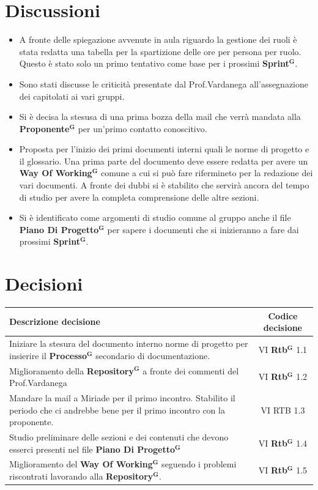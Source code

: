 \documentclass[a4paper,12pt]{article}
\newcommand{\term}[1]{\textbf{#1}$^\mathbf{G}$}
\begin{document}
\section{Discussioni}
\begin{itemize}
    \item A fronte delle spiegazione avvenute in aula riguardo la gestione dei ruoli è stata redatta una tabella per la spartizione delle ore per persona per ruolo. Questo è stato solo un primo tentativo come base per i prossimi \term{Sprint}.
    \item Sono stati discusse le criticità presentate dal Prof.Vardanega all'assegnazione dei capitolati ai vari gruppi.
    \item Si è decisa la stesusa di una prima bozza della mail che verrà mandata alla \term{Proponente} per un'primo contatto conoscitivo.
    \item Proposta per l'inizio dei primi documenti interni quali le norme di progetto e il glossario. Una prima parte del documento deve essere redatta per avere un \term{Way Of Working} comune a cui si può fare rifermineto per la redazione dei vari documenti. A fronte dei dubbi si è stabilito che servirà ancora del tempo di studio per avere la completa comprensione delle altre sezioni.
    \item Si è identificato come argomenti di studio comune al gruppo anche il file \term{Piano Di Progetto} per sapere i documenti che si inizieranno a fare dai prossimi \term{Sprint}.
\end{itemize}

\section{Decisioni}
\begin{center}
\small
\renewcommand{\arraystretch}{1.2} 
\begin{tabular}{|p{}|c|}
\hline
\rowcolor{gray!60} 
\textbf{Descrizione decisione} & \textbf{Codice decisione} \\
\hline
\rowcolor{white}
Iniziare la stesura del documento interno norme di progetto per insierire il \term{Processo} secondario di documentazione. & VI \term{Rtb} 1.1 \\
\hline
\rowcolor{gray!20}
Miglioramento della \term{Repository} a fronte dei commenti del Prof.Vardanega &  VI \term{Rtb} 1.2 \\
\hline
\rowcolor{white}
Mandare la mail a Miriade per il primo incontro. Stabilito il periodo che ci andrebbe bene per il primo incontro con la proponente. & VI RTB 1.3\\
\hline
\rowcolor{gray!20}
Studio preliminare delle sezioni e dei contenuti che devono esserci presenti nel file \term{Piano Di Progetto} &  VI \term{Rtb} 1.4\\
\hline
\rowcolor{white}
Miglioramento del \term{Way Of Working} seguendo i problemi riscontrati lavorando alla \term{Repository}. &  VI \term{Rtb} 1.5\\
\hline
\end{tabular}
\end{center}
\end{document}
